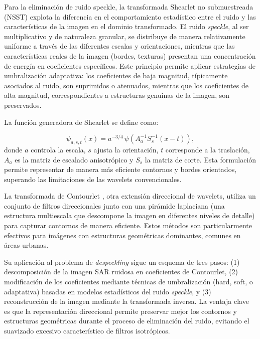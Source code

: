 Para la eliminación de ruido speckle, la transformada Shearlet no submuestreada (NSST) explota la diferencia en el comportamiento estadístico entre el ruido y las características de la imagen en el dominio transformado. El ruido \emph{speckle}, al ser multiplicativo y de naturaleza granular, se distribuye de manera relativamente uniforme a través de las diferentes escalas y orientaciones, mientras que las características reales de la imagen (bordes, texturas) presentan una concentración de energía en coeficientes específicos. Este principio permite aplicar estrategias de umbralización adaptativa: los coeficientes de baja magnitud, típicamente asociados al ruido, son suprimidos o atenuados, mientras que los coeficientes de alta magnitud, correspondientes a estructuras genuinas de la imagen, son preservados.

La función generadora de Shearlet se define como:

\begin{equation}
	\psi_{a,s,t}(x) = a^{-3/4}\,\psi\!\left(A_a^{-1}S_s^{-1}(x-t)\right),
\end{equation}
donde $a$ controla la escala, $s$ ajusta la orientación, $t$ corresponde a la traslación, $A_a$ es la matriz de escalado anisotrópico y $S_s$ la matriz de corte. Esta formulación permite representar de manera más eficiente contornos y bordes orientados, superando las limitaciones de las wavelets convencionales.

La transformada de Contourlet \cite{po2006directional}, otra extensión direccional de wavelets, utiliza un conjunto de filtros direccionales junto con una pirámide laplaciana (una estructura multiescala que descompone la imagen en diferentes niveles de detalle) para capturar contornos de manera eficiente. Estos métodos son particularmente efectivos para imágenes con estructuras geométricas dominantes, comunes en áreas urbanas.

Su aplicación al problema de \emph{despeckling} sigue un esquema de tres pasos: (1) descomposición de la imagen SAR ruidosa en coeficientes de Contourlet, (2) modificación de los coeficientes mediante técnicas de umbralización (hard, soft, o adaptativa) basadas en modelos estadísticos del ruido \emph{speckle}, y (3) reconstrucción de la imagen mediante la transformada inversa. La ventaja clave es que la representación direccional permite preservar mejor los contornos y estructuras geométricas durante el proceso de eliminación del ruido, evitando el suavizado excesivo característico de filtros isotrópicos.

